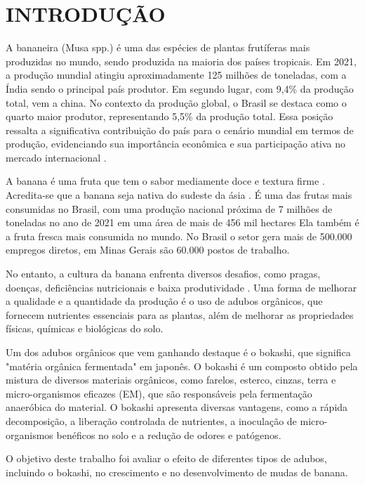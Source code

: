 \chapter{INTRODUÇÃO}

A bananeira (Musa spp.) é uma das espécies de plantas frutíferas mais produzidas no mundo, sendo produzida na maioria dos países tropicais. Em 2021, a produção mundial atingiu aproximadamente 125 milhões de toneladas, com a Índia sendo o principal país produtor. Em segundo lugar, com 9,4\% da produção total, vem a china. No contexto da produção global, o Brasil se destaca como o quarto maior produtor, representando 5,5\% da produção total. Essa posição ressalta a significativa contribuição do país para o cenário mundial em termos de produção, evidenciando sua importância econômica e sua participação ativa no mercado internacional \cite{banana}. 

A banana é uma fruta que tem o sabor mediamente doce e textura firme \cite{MATSUURA2004}. Acredita-se que a banana seja nativa do sudeste da ásia \cite{1956TaOo}. É uma das frutas mais consumidas no Brasil, com uma produção nacional próxima de 7 milhões de toneladas no ano de 2021 em uma área de mais de 456 mil hectares \cite{banana} Ela também é a fruta fresca mais consumida no mundo. No Brasil o setor gera mais de 500.000 empregos diretos, em Minas Gerais são 60.000 postos de trabalho.

No entanto, a cultura da banana enfrenta diversos desafios, como pragas, doenças, deficiências nutricionais e baixa produtividade \cite{nogueira2013bananicultura}. Uma forma de melhorar a qualidade e a quantidade da produção é o uso de adubos orgânicos, que fornecem nutrientes essenciais para as plantas, além de melhorar as propriedades físicas, químicas e biológicas do solo.

Um dos adubos orgânicos que vem ganhando destaque é o bokashi, que significa "matéria orgânica fermentada" em japonês. O bokashi é um composto obtido pela mistura de diversos materiais orgânicos, como farelos, esterco, cinzas, terra e micro-organismos eficazes (EM), que são responsáveis pela fermentação anaeróbica do material. O bokashi apresenta diversas vantagens, como a rápida decomposição, a liberação controlada de nutrientes, a inoculação de micro-organismos benéficos no solo e a redução de odores e patógenos.

O objetivo deste trabalho foi avaliar o efeito de diferentes tipos de adubos, incluindo o bokashi, no crescimento e no desenvolvimento de mudas de banana. 

